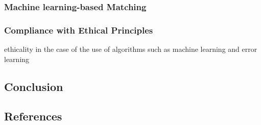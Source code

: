 \documentclass[letterpaper]{article} %
\begin{document}
\cite{basshuysen} 

\subsubsection{Machine learning-based Matching}

\cite{olbergml}

\subsubsection{Compliance with Ethical Principles}

\cite{basshuysen} 

ethicality in the case of the use of algorithms such as machine learning and error learning 

\subsection{Conclusion}

\subsection{References}



\end{document}
